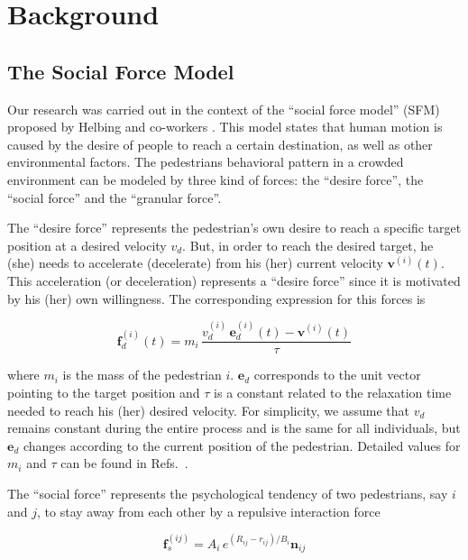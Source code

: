 \section{\label{background}Background}

\subsection{\label{sfm}The Social Force Model}

Our research was carried out in the context of the ``social force model'' (SFM) 
proposed by Helbing and co-workers \cite{Helbing1}. This model states that human 
motion is caused by the desire of people to reach a certain destination, as 
well as other environmental factors. The pedestrians behavioral pattern in a 
crowded environment can be modeled by three kind of forces: the ``desire 
force'', the ``social force'' and the ``granular force''.

The ``desire force'' represents the pedestrian's own desire to reach a 
specific target position at a desired velocity $v_d$. But, in order to reach 
the desired target, he (she) needs to accelerate (decelerate) from his (her) 
current velocity $\mathbf{v}^{(i)}(t)$. This acceleration (or deceleration) 
represents a ``desire force'' since it is motivated by his (her) own 
willingness. The corresponding expression for this forces is 

\begin{equation}
        \mathbf{f}_d^ {(i)}(t) =  
m_i\,\displaystyle\frac{v_d^{(i)}\,\mathbf{e}_d^
{(i)}(t)-\mathbf{v}^{(i)}(t)}{\tau} \label{desired}
\end{equation}

where $m_i$ is the mass of the pedestrian $i$. $\mathbf{e}_d$ 
corresponds to the unit vector pointing to the target position and $\tau$ is a 
constant related to the relaxation time needed to reach his (her) desired 
velocity. For simplicity, we assume that 
$v_d$ remains constant during the entire process and is the same for all 
individuals, but $\mathbf{e}_d$ changes according to the current position of the 
pedestrian. Detailed values for $m_i$ and $\tau$ can be found in 
Refs.~\cite{Helbing1,Dorso3}. 

The ``social force'' represents the psychological tendency of two pedestrians,  
say $i$ and $j$, to stay away from each other by a repulsive interaction force 

\begin{equation}
        \mathbf{f}_s^{(ij)} = A_i\,e^{(R_{ij}-r_{ij})/B_i}\mathbf{n}_{ij} 
        \label{social}
\end{equation}

